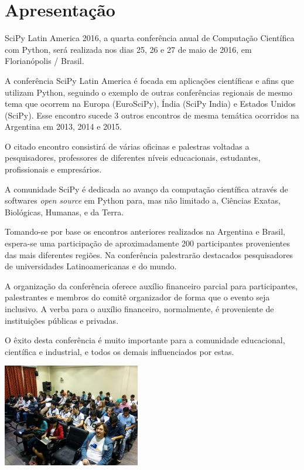 \documentclass[a4paper,twocolumn,openright,article,12pt]{memoir}
\begin{document}
\clearpage

\restoregeometry
\pagestyle{plain} %
\setcounter{page}{2}
\tableofcontents*

\chapter*{Apresentação}

SciPy Latin America 2016, a quarta conferência anual de Computação Científica com Python, será realizada nos dias 25, 26 e 27 de maio de 2016, em Florianópolis / Brasil.

A conferência SciPy Latin America é focada em aplicações científicas e afins que
utilizam Python, seguindo o exemplo de outras conferências regionais de mesmo tema que ocorrem na Europa (EuroSciPy), Índia (SciPy India) e Estados Unidos (SciPy). Esse encontro sucede 3 outros encontros de mesma temática ocorridos na Argentina em 2013, 2014 e 2015.

O citado encontro consistirá de várias oficinas e palestras voltadas a pesquisadores, professores de diferentes níveis educacionais, estudantes, profissionais e empresários.

A comunidade SciPy é dedicada ao avanço da computação científica através de softwares \emph{open source} em Python para, mas não limitado a, Ciências Exatas, Biológicas, Humanas, e da Terra.

Tomando-se por base os encontros anteriores realizados na Argentina e Brasil, espera-se uma participação de aproximadamente 200 participantes provenientes das mais diferentes regiões. Na conferência palestrarão destacados pesquisadores de universidades Latinoamericanas e do mundo.

A organização da conferência oferece auxílio financeiro parcial para participantes,
palestrantes e membros do comitê organizador de forma que o evento seja inclusivo.
A verba para o auxílio financeiro, normalmente, é proveniente
de instituições públicas e privadas.

O êxito desta conferência é muito importante para a comunidade educacional, científica e industrial, e todos os demais influenciados por estas.

\ifprint
\else
	\begin{center}
		\includegraphics[width=6cm]{imagens/IMG_20150521_102157-small.jpg}
	\end{center}
\fi
\end{document}
